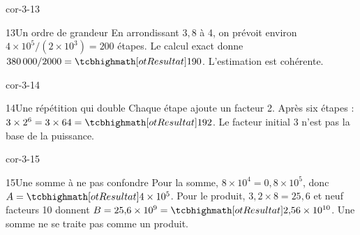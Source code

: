 \begin{blocLivre}{cor-3-13}\begin{corrige}{13}{Un ordre de grandeur}
En arrondissant $3{,}8$ à 4, on prévoit environ $4\times10^5/(2\times10^3)=200$ étapes. Le calcul exact donne $380\,000/2000=\res{190}$. L’estimation est cohérente.
\end{corrige}\end{blocLivre}
\begin{blocLivre}{cor-3-14}\begin{corrige}{14}{Une répétition qui double}
Chaque étape ajoute un facteur 2. Après six étapes : $3\times2^6=3\times64=\res{192}$. Le facteur initial 3 n’est pas la base de la puissance.
\end{corrige}\end{blocLivre}
\begin{blocLivre}{cor-3-15}\begin{corrige}{15}{Une somme à ne pas confondre}
Pour la somme, $8\times10^4=0{,}8\times10^5$, donc $A=\res{4\times10^5}$. Pour le produit, $3{,}2\times8=25{,}6$ et neuf facteurs 10 donnent $B=25{,}6\times10^9=\res{2{,}56\times10^{10}}$. Une somme ne se traite pas comme un produit.
\end{corrige}\end{blocLivre}
